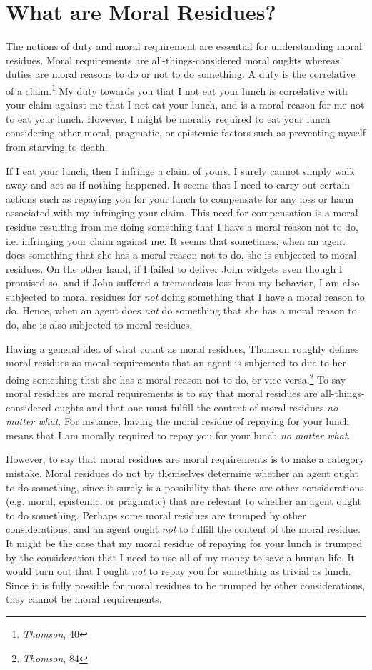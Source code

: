 \section{What are Moral Residues?}

The notions of duty and moral requirement are essential for
understanding moral residues. Moral requirements are
all-things-considered moral oughts whereas duties are moral reasons to
do or not to do something. A duty is the correlative of a
claim.\footnote{\emph{Thomson}, 40} My duty towards you that I not eat
your lunch is correlative with your claim against me that I not eat your
lunch, and is a moral reason for me not to eat your lunch. However, I
might be morally required to eat your lunch considering other moral,
pragmatic, or epistemic factors such as preventing myself from starving
to death.

If I eat your lunch, then I infringe a claim of yours. I surely cannot
simply walk away and act as if nothing happened. It seems that I need to
carry out certain actions such as repaying you for your lunch to
compensate for any loss or harm associated with my infringing your
claim. This need for compensation is a moral residue resulting from me
doing something that I have a moral reason not to do, i.e. infringing
your claim against me. It seems that sometimes, when an agent does
something that she has a moral reason not to do, she is subjected to
moral residues. On the other hand, if I failed to deliver John widgets
even though I promised so, and if John suffered a tremendous loss from
my behavior, I am also subjected to moral residues for \emph{not} doing
something that I have a moral reason to do. Hence, when an agent does
\emph{not} do something that she has a moral reason to do, she is also
subjected to moral residues.

Having a general idea of what count as moral residues, Thomson roughly
defines moral residues as moral requirements that an agent is subjected
to due to her doing something that she has a moral reason not to do, or
vice versa.\footnote{\emph{Thomson}, 84} To say moral residues are moral
requirements is to say that moral residues are all-things-considered
oughts and that one must fulfill the content of moral residues \emph{no
matter what}. For instance, having the moral residue of repaying for
your lunch means that I am morally required to repay you for your lunch
\emph{no matter what}.

However, to say that moral residues are moral requirements is to make a
category mistake. Moral residues do not by themselves determine whether
an agent ought to do something, since it surely is a possibility that
there are other considerations (e.g. moral, epistemic, or pragmatic)
that are relevant to whether an agent ought to do something. Perhaps
some moral residues are trumped by other considerations, and an agent
ought \emph{not} to fulfill the content of the moral residue. It might
be the case that my moral residue of repaying for your lunch is trumped
by the consideration that I need to use all of my money to save a human
life. It would turn out that I ought \emph{not} to repay you for
something as trivial as lunch. Since it is fully possible for moral
residues to be trumped by other considerations, they cannot be moral
requirements.

